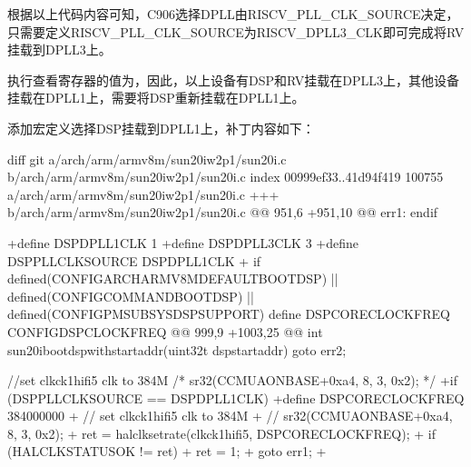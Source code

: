 \documentclass[letterpaper,10pt,english]{sphinxmanual}
\begin{document}
\sphinxAtStartPar
根据以上代码内容可知，C906选择DPLL由RISCV\_PLL\_CLK\_SOURCE决定，只需要定义RISCV\_PLL\_CLK\_SOURCE为RISCV\_DPLL3\_CLK即可完成将RV挂载到DPLL3上。

\sphinxAtStartPar
执行查看寄存器的值为，因此，以上设备有DSP和RV挂载在DPLL3上，其他设备挂载在DPLL1上，需要将DSP重新挂载在DPLL1上。

\sphinxAtStartPar
{}

\sphinxAtStartPar
添加宏定义选择DSP挂载到DPLL1上，补丁内容如下：

\begin{sphinxVerbatim}[commandchars=\\\{\}]
diff \PYGZhy{}\PYGZhy{}git a/arch/arm/armv8m/sun20iw2p1/sun20i.c b/arch/arm/armv8m/sun20iw2p1/sun20i.c
index 00999ef33..41d94f419 100755
\PYGZhy{}\PYGZhy{}\PYGZhy{} a/arch/arm/armv8m/sun20iw2p1/sun20i.c
+++ b/arch/arm/armv8m/sun20iw2p1/sun20i.c
@@ \PYGZhy{}951,6 +951,10 @@ err1:
 \PYGZcb{}
 \PYGZsh{}endif

+\PYGZsh{}define DSP\PYGZus{}DPLL1\PYGZus{}CLK 1
+\PYGZsh{}define DSP\PYGZus{}DPLL3\PYGZus{}CLK 3
+\PYGZsh{}define DSP\PYGZus{}PLL\PYGZus{}CLK\PYGZus{}SOURCE DSP\PYGZus{}DPLL1\PYGZus{}CLK
+
 \PYGZsh{}if defined(CONFIG\PYGZus{}ARCH\PYGZus{}ARMV8M\PYGZus{}DEFAULT\PYGZus{}BOOT\PYGZus{}DSP) || defined(CONFIG\PYGZus{}COMMAND\PYGZus{}BOOT\PYGZus{}DSP) \PYGZbs{}
        || defined(CONFIG\PYGZus{}PM\PYGZus{}SUBSYS\PYGZus{}DSP\PYGZus{}SUPPORT)
 \PYGZsh{}define DSP\PYGZus{}CORE\PYGZus{}CLOCK\PYGZus{}FREQ CONFIG\PYGZus{}DSP\PYGZus{}CLOCK\PYGZus{}FREQ
@@ \PYGZhy{}999,9 +1003,25 @@ int \PYGZus{}\PYGZus{}sun20i\PYGZus{}boot\PYGZus{}dsp\PYGZus{}with\PYGZus{}start\PYGZus{}addr(uint32\PYGZus{}t dsp\PYGZus{}start\PYGZus{}addr)
         goto err2;
     \PYGZcb{}

\PYGZhy{}    //set clk\PYGZus{}ck1\PYGZus{}hifi5 clk to 384M
\PYGZhy{}    /* sr32(CCMU\PYGZus{}AON\PYGZus{}BASE+0xa4,  8, 3, 0x2); */
+\PYGZsh{}if (DSP\PYGZus{}PLL\PYGZus{}CLK\PYGZus{}SOURCE == DSP\PYGZus{}DPLL1\PYGZus{}CLK)
+\PYGZsh{}define DSP\PYGZus{}CORE\PYGZus{}CLOCK\PYGZus{}FREQ 384000000
+    // set clk\PYGZus{}ck1\PYGZus{}hifi5 clk to 384M
+    // sr32(CCMU\PYGZus{}AON\PYGZus{}BASE+0xa4,  8, 3, 0x2);
+    ret = hal\PYGZus{}clk\PYGZus{}set\PYGZus{}rate(clk\PYGZus{}ck1\PYGZus{}hifi5, DSP\PYGZus{}CORE\PYGZus{}CLOCK\PYGZus{}FREQ);
+    if (HAL\PYGZus{}CLK\PYGZus{}STATUS\PYGZus{}OK != ret) \PYGZob{}
+        ret = \PYGZhy{}1;
+        goto err1;
+    \PYGZcb{}


\end{sphinxVerbatim}
\end{document}
